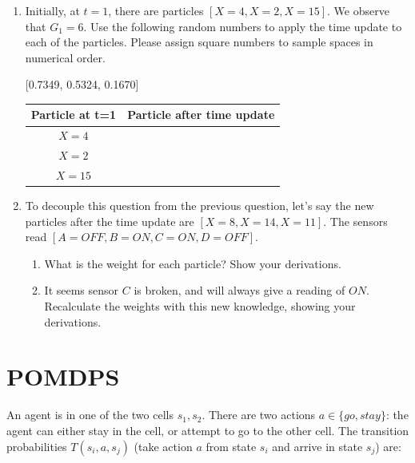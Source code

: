 \documentclass[12pt]{article}
\begin{document}
\begin{enumerate}

\item Initially, at $t=1$, there are particles $[X=4, X=2, X=15]$. We
  observe that $G_1 = 6$. Use the following random numbers to apply
  the time update to each of the particles. Please assign square numbers
    to sample spaces in numerical order.

\vspace{-1ex}
\begin{center} [0.7349, 0.5324, 0.1670] \end{center}
  
\begin{center}
\renewcommand{\arraystretch}{2}
\begin{tabular} {|c|c|}
\hline
Particle at t=1 & Particle after time update \\ \hline
$X=4$  &  \\ \hline
$X=2$  &  \\ \hline
$X=15$ &  \\
\hline
\end{tabular}
\end{center}
  
\item To decouple this question from the previous question, let's say
  the new particles after the time update are $[X=8, X=14, X=11]$.
  The sensors read $[A=OFF, B=ON, C=ON, D=OFF]$.

  \begin{enumerate}

  \item What is the weight for each particle?  Show your derivations.

  \item It seems sensor $C$ is broken, and will always give a reading
    of $ON$. Recalculate the weights with this new knowledge, showing
    your derivations.

  \end{enumerate}

\end{enumerate}

\clearpage

\section{POMDPS}

An agent is in one of the two cells $s_1,s_2$.  There are two actions
$a \in \{ go, stay\}$: the agent can either stay in the cell, or
attempt to go to the other cell.  The transition probabilities
$T(s_i,a,s_j)$ (take action $a$ from state $s_i$ and arrive in state
$s_j$) are:
\end{document}
